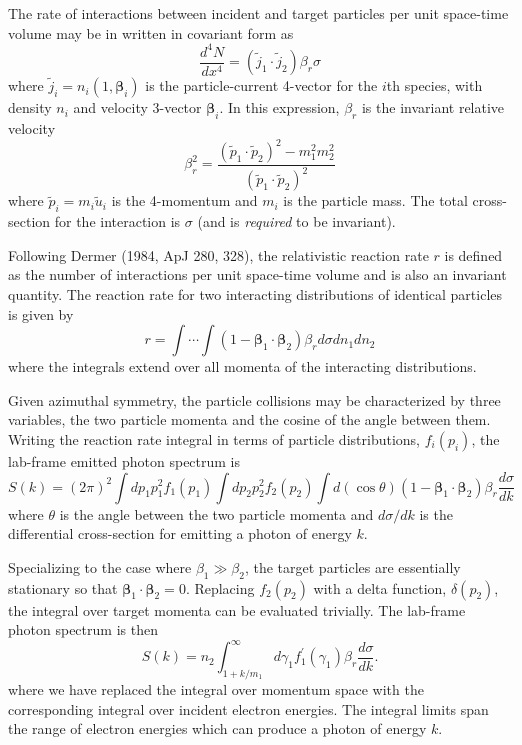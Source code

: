 \documentclass[12pt]{article}
\begin{document}
The rate of interactions between incident and target particles
per unit space-time volume may be in written in covariant form as
\begin{equation}
  \frac{d^4N}{dx^4} = \left({\tilde j_1}\cdot{\tilde j_2}\right) \beta_r \sigma
\end{equation}
where ${\tilde j_i} = n_i(1,{\bm \beta_i})$ is the particle-current
4-vector for the $i$th species, with density $n_i$ and velocity
3-vector ${\bm \beta_i}$.  In this expression, $\beta_r$ is the invariant
relative velocity
\begin{equation}
  \beta_r^2 = \frac{\left({\tilde p_1}\cdot{\tilde p_2}\right)^2
              - m_1^2 m_2^2}{\left({\tilde p_1}\cdot{\tilde p_2}\right)^2}
\end{equation}
where ${\tilde p_i} = m_i{\tilde u_i}$ is the 4-momentum
and $m_i$ is the particle mass.  The total cross-section for
the interaction is $\sigma$ (and is {\it required} to be invariant).

Following Dermer (1984, ApJ 280, 328), the relativistic
reaction rate $r$ is defined as the number of interactions per
unit space-time volume and is also an invariant quantity.
The reaction rate for two interacting distributions of
identical particles is given by
\begin{equation}
 r = \int\cdots\int \left(1 - {\bm \beta_1} \cdot {\bm \beta_2}\right) \beta_r d\sigma dn_1 dn_2
\end{equation}
where the integrals extend over all momenta of the interacting
distributions.

Given azimuthal symmetry, the particle collisions may be
characterized by three variables, the two particle momenta and
the cosine of the angle between them. Writing the reaction rate
integral in terms of particle distributions, $f_i(p_i)$,
the lab-frame emitted photon spectrum is
\begin{equation}
 S(k) = \left(2\pi\right)^2
        \int dp_1 p_1^2 f_1(p_1)
        \int dp_2 p_2^2 f_2(p_2)
        \int d(\cos\theta)
        \left(1 - {\bm \beta_1} \cdot {\bm \beta_2}\right)
        \beta_r \frac{d\sigma}{dk}
\end{equation}
where $\theta$ is the angle between the two particle momenta
and $d\sigma/dk$ is the differential cross-section for emitting
a photon of energy $k$.

Specializing to the case where $\beta_1 \gg \beta_2$, the
target particles are essentially stationary so that ${\bm
\beta_1} \cdot {\bm \beta_2} = 0$. Replacing $f_2(p_2)$ with a
delta function, $\delta(p_2)$, the integral over target momenta
can be evaluated trivially. The lab-frame photon spectrum is
then
\begin{equation}
S(k) = n_2 \int_{1 + k/m_1}^\infty d\gamma_1
        f_1^\prime(\gamma_1) \beta_r \frac{d\sigma}{dk}.
\label{eebrems-spectrum}
\end{equation}
where we have replaced the integral over momentum space
with the corresponding integral over incident electron energies.
The integral limits span the range of electron energies
which can produce a photon of energy $k$.
\end{document}
